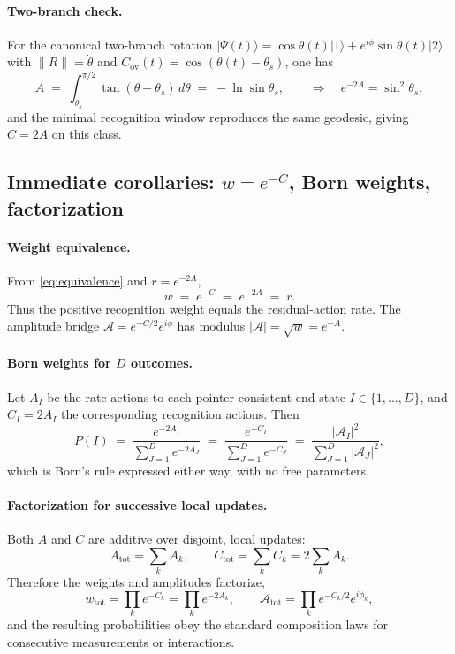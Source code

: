 \documentclass[11pt,letterpaper]{article}
\begin{document}
\paragraph{Two-branch check.}
For the canonical two-branch rotation \(\lvert\Psi(t)\rangle=\cos\theta(t)\lvert 1\rangle+e^{i\phi}\sin\theta(t)\lvert 2\rangle\) with \(\|R\|=\dot\theta\) and \(C_{\mathrm{ov}}(t)=\cos(\theta(t)-\theta_s)\), one has
\[
A\;=\;\int_{\theta_s}^{\pi/2}\!\tan(\theta-\theta_s)\,d\theta\;=\;-\ln\sin\theta_s,\qquad
\Rightarrow\quad e^{-2A}=\sin^2\theta_s,
\]
and the minimal recognition window reproduces the same geodesic, giving \(C=2A\) on this class.

\subsection{Immediate corollaries: \(w=e^{-C}\), Born weights, factorization}

\paragraph{Weight equivalence.}
From \eqref{eq:equivalence} and \(r=e^{-2A}\),
\begin{equation}
w\;=\;e^{-C}\;=\;e^{-2A}\;=\;r.
\label{eq:w-equals-rate}
\end{equation}
Thus the positive recognition weight equals the residual-action rate. The amplitude bridge \(\mathcal A=e^{-C/2}e^{i\phi}\) has modulus \(|\mathcal A|=\sqrt w=e^{-A}\).

\paragraph{Born weights for \(D\) outcomes.}
Let \(A_I\) be the rate actions to each pointer-consistent end-state \(I\in\{1,\dots,D\}\), and \(C_I=2A_I\) the corresponding recognition actions. Then
\begin{equation}
P(I)\;=\;\frac{e^{-2A_I}}{\sum_{J=1}^D e^{-2A_J}}
\;=\;\frac{e^{-C_I}}{\sum_{J=1}^D e^{-C_J}}
\;=\;\frac{|\mathcal A_I|^2}{\sum_{J=1}^D |\mathcal A_J|^2},
\end{equation}
which is Born’s rule expressed either way, with no free parameters.

\paragraph{Factorization for successive local updates.}
Both \(A\) and \(C\) are additive over disjoint, local updates:
\[
A_{\mathrm{tot}}=\sum_k A_k,\qquad C_{\mathrm{tot}}=\sum_k C_k=2\sum_k A_k.
\]
Therefore the weights and amplitudes factorize,
\[
w_{\mathrm{tot}}=\prod_k e^{-C_k}=\prod_k e^{-2A_k},\qquad
\mathcal A_{\mathrm{tot}}=\prod_k e^{-C_k/2}e^{i\phi_k},
\]
and the resulting probabilities obey the standard composition laws for consecutive measurements or interactions.
\end{document}
